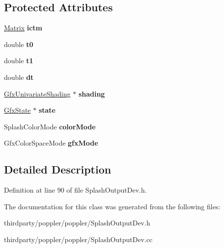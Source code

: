 \subsection*{Protected Attributes}
\begin{DoxyCompactItemize}
\item 
\mbox{\label{class_splash_univariate_pattern_a4650b9fba620c9138c203cea639552cf}} 
\hyperlink{class_matrix}{Matrix} {\bfseries ictm}
\item 
\mbox{\label{class_splash_univariate_pattern_a599a1d9d0e9a04cf46bd5393c276c0a3}} 
double {\bfseries t0}
\item 
\mbox{\label{class_splash_univariate_pattern_a89307c3ae4eab2b49df0edaf2d5afe98}} 
double {\bfseries t1}
\item 
\mbox{\label{class_splash_univariate_pattern_ae025e1280250ab6a1e502cf33d6a6da4}} 
double {\bfseries dt}
\item 
\mbox{\label{class_splash_univariate_pattern_a4fefb35829f07016802cc102ec58ad6b}} 
\hyperlink{class_gfx_univariate_shading}{Gfx\+Univariate\+Shading} $\ast$ {\bfseries shading}
\item 
\mbox{\label{class_splash_univariate_pattern_a68d00e9194c211561567e62276acc981}} 
\hyperlink{class_gfx_state}{Gfx\+State} $\ast$ {\bfseries state}
\item 
\mbox{\label{class_splash_univariate_pattern_a1ee7ae80f02353648d917251ba76f0a1}} 
Splash\+Color\+Mode {\bfseries color\+Mode}
\item 
\mbox{\label{class_splash_univariate_pattern_a4880634c6dc979b1a820791c933f4451}} 
Gfx\+Color\+Space\+Mode {\bfseries gfx\+Mode}
\end{DoxyCompactItemize}


\subsection{Detailed Description}


Definition at line 90 of file Splash\+Output\+Dev.\+h.



The documentation for this class was generated from the following files\+:\begin{DoxyCompactItemize}
\item 
thirdparty/poppler/poppler/Splash\+Output\+Dev.\+h\item 
thirdparty/poppler/poppler/Splash\+Output\+Dev.\+cc\end{DoxyCompactItemize}
